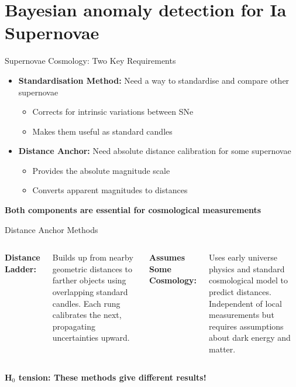 \documentclass[aspectratio=169]{beamer}
\begin{document}
\section{Bayesian anomaly detection for Ia Supernovae}

\begin{frame}{Supernovae Cosmology: Two Key Requirements}
  \begin{itemize}
    \item \textbf{Standardisation Method:} Need a way to standardise and compare other supernovae
      \begin{itemize}
        \item Corrects for intrinsic variations between SNe
        \item Makes them useful as standard candles
      \end{itemize}
    \item \textbf{Distance Anchor:} Need absolute distance calibration for some supernovae
      \begin{itemize}
        \item Provides the absolute magnitude scale
        \item Converts apparent magnitudes to distances
      \end{itemize}
  \end{itemize}
  \vfill
  \centering
  \textbf{Both components are essential for cosmological measurements}
\end{frame}

\begin{frame}{Distance Anchor Methods}
  \begin{columns}
    \textbf{Distance Ladder:}
    
    Builds up from nearby geometric distances to farther objects using overlapping standard candles. Each rung calibrates the next, propagating uncertainties upward.
    
    \textbf{Assumes Some Cosmology:}
    
    Uses early universe physics and standard cosmological model to predict distances. Independent of local measurements but requires assumptions about dark energy and matter.
  \end{columns}
  \vfill
  \centering
  \textbf{H$_0$ tension: These methods give different results!}
\end{frame}
\end{document}
